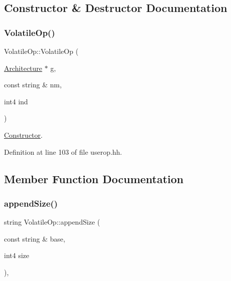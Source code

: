\subsection{Constructor \& Destructor Documentation}
\mbox{\label{class_volatile_op_af8e858394ba7b9ae030a30ebb90ed73c}} 
\subsubsection{\texorpdfstring{VolatileOp()}{VolatileOp()}}
{\footnotesize\ttfamily Volatile\+Op\+::\+Volatile\+Op (\begin{DoxyParamCaption}\item[{\mbox{\hyperlink{class_architecture}{Architecture}} $\ast$}]{g,  }\item[{const string \&}]{nm,  }\item[{int4}]{ind }\end{DoxyParamCaption})\hspace{0.3cm}{\ttfamily [inline]}}



\mbox{\hyperlink{class_constructor}{Constructor}}. 



Definition at line 103 of file userop.\+hh.



\subsection{Member Function Documentation}
\mbox{\label{class_volatile_op_a49723e93482e3ece0899463711b2ba6b}} 
\subsubsection{\texorpdfstring{appendSize()}{appendSize()}}
{\footnotesize\ttfamily string Volatile\+Op\+::append\+Size (\begin{DoxyParamCaption}\item[{const string \&}]{base,  }\item[{int4}]{size }\end{DoxyParamCaption})\hspace{0.3cm}{\ttfamily [static]}, {\ttfamily [protected]}}



